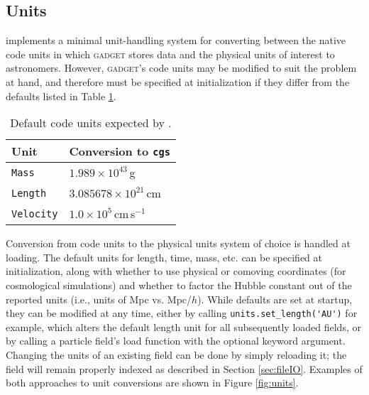 \subsection{Units}
\label{sec:units}
 implements a minimal unit-handling system for converting between the native code units in which \textsc{gadget} stores data and the physical units of interest to astronomers.  
However, \textsc{gadget}'s code units may be modified to suit the problem at hand, and therefore must be specified at initialization if they differ from the defaults listed in Table \ref{code_unit_defaults}.
\begin{table}[h!]
    \centering
    \caption{Default code units expected by .}
    \label{code_unit_defaults}
    \begin{tabular}{ll}
        \hline
        Unit & Conversion to \verb|cgs|\\
        \hline
        \verb|Mass| &  $1.989\times10^{43}\,$g\\ 
        \verb|Length| & $3.085678\times10^{21}\,$cm \\ 
        \verb|Velocity| & $1.0\times10^5\,$cm$\,$s$^{-1}$ \\ 
    \end{tabular} 
\end{table}
Conversion from code units to the physical units system of choice is handled at loading.
The default units for length, time, mass, etc. can be specified at initialization, along with whether to use physical or comoving coordinates (for cosmological simulations) and whether to factor the Hubble constant out of the reported units (i.e., units of Mpc vs. Mpc/$h$).
While defaults are set at startup, they can be modified at any time, either by calling \verb|units.set_length('AU')| for example, which alters the default length unit for all subsequently loaded fields, or by calling a particle field's load function with the optional  keyword argument.  
Changing the units of an existing field can be done by simply reloading it; the field will remain properly indexed as described in Section \ref{sec:fileIO}. Examples of both approaches to unit conversions are shown in Figure \ref{fig:units}.